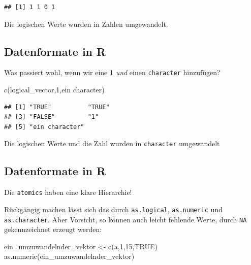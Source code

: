 \documentclass[
]{book}
\newenvironment{Shaded}{\begin{snugshade}}{\end{snugshade}}
\newcommand{\ConstantTok}[1]{\textcolor[rgb]{0.00,0.00,0.00}{#1}}
\newcommand{\DecValTok}[1]{\textcolor[rgb]{0.00,0.00,0.81}{#1}}
\newcommand{\FunctionTok}[1]{\textcolor[rgb]{0.00,0.00,0.00}{#1}}
\newcommand{\NormalTok}[1]{#1}
\newcommand{\OtherTok}[1]{\textcolor[rgb]{0.56,0.35,0.01}{#1}}
\newcommand{\StringTok}[1]{\textcolor[rgb]{0.31,0.60,0.02}{#1}}
\begin{document}
\begin{verbatim}
## [1] 1 1 0 1
\end{verbatim}

Die logischen Werte wurden in Zahlen umgewandelt.

\hypertarget{datenformate-in-r-4}{%
\subsection{Datenformate in R}\label{datenformate-in-r-4}}

Was passiert wohl, wenn wir eine 1 \emph{und} einen \texttt{character} hinzufügen?

\begin{Shaded}
\begin{Highlighting}[]
\FunctionTok{c}\NormalTok{(logical\_vector,}\DecValTok{1}\NormalTok{,}\StringTok{\textquotesingle{}ein character\textquotesingle{}}\NormalTok{)}
\end{Highlighting}
\end{Shaded}

\begin{verbatim}
## [1] "TRUE"          "TRUE"         
## [3] "FALSE"         "1"            
## [5] "ein character"
\end{verbatim}

Die logischen Werte und die Zahl wurden in \texttt{character} umgewandelt

\hypertarget{datenformate-in-r-5}{%
\subsection{Datenformate in R}\label{datenformate-in-r-5}}

Die \texttt{atomics} haben eine klare Hierarchie!

Rückgängig machen lässt sich das durch \texttt{as.logical}, \texttt{as.numeric} und \texttt{as.character}. Aber Vorsicht, so können auch leicht fehlende Werte, durch \texttt{NA} gekennzeichnet erzeugt werden:

\begin{Shaded}
\begin{Highlighting}[]
\NormalTok{ein\_umzuwandelnder\_vektor }\OtherTok{\textless{}{-}} \FunctionTok{c}\NormalTok{(}\StringTok{\textquotesingle{}a\textquotesingle{}}\NormalTok{,}\DecValTok{1}\NormalTok{,}\DecValTok{15}\NormalTok{,}\ConstantTok{TRUE}\NormalTok{)}
\FunctionTok{as.numeric}\NormalTok{(ein\_umzuwandelnder\_vektor)}
\end{Highlighting}
\end{Shaded}
\end{document}
